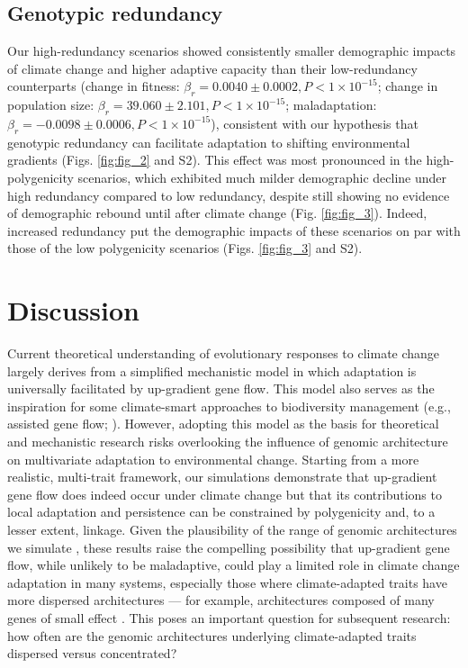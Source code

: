 \documentclass[9pt,twocolumn,twoside,lineno]{new_article}
\begin{document}
\subsection*{Genotypic redundancy}
Our high-redundancy scenarios showed
consistently smaller demographic impacts of climate change and higher adaptive capacity
than their low-redundancy counterparts 
(change in fitness: $\beta_{r} = 0.0040\pm0.0002, P<1\times10^{-15}$;
change in population size: $\beta_{r} = 39.060\pm2.101, P<1\times10^{-15}$;
maladaptation: $\beta_{r} = -0.0098\pm0.0006, P<1\times10^{-15}$), consistent with our hypothesis that
genotypic redundancy can facilitate adaptation to shifting environmental gradients (Figs. \ref{fig:fig_2} and S2).
This effect was most pronounced in the high-polygenicity scenarios,
which exhibited much milder demographic decline under high redundancy compared to low redundancy,
despite still showing no evidence of demographic rebound until after climate change (Fig. \ref{fig:fig_3}).
Indeed, increased redundancy put the demographic
impacts of these scenarios on par with those
of the low polygenicity scenarios (Figs. \ref{fig:fig_3} and S2).


\section*{Discussion}

Current theoretical understanding of evolutionary responses to climate change
largely derives from a simplified mechanistic model in which
adaptation is universally facilitated by up-gradient gene flow.
This model also serves as the inspiration for some climate-smart
approaches to biodiversity management
(e.g., assisted gene flow; \cite{aitken_whitlock}).
However, adopting this model as the basis
for theoretical and mechanistic research
risks overlooking the influence of
genomic architecture on multivariate adaptation to environmental change.
Starting from a more realistic, multi-trait framework,
our simulations demonstrate that up-gradient gene flow does indeed
occur under climate change
but that its contributions to local adaptation and persistence can be constrained
by polygenicity and, to a lesser extent, linkage.
Given the plausibility of the range of genomic architectures we simulate
\cite{barghi_polygenic,boyle,rockman,savolainen,sella,bomblies},
these results raise the compelling
possibility that up-gradient gene flow, while unlikely
to be maladaptive, could play a limited role in
climate change adaptation in many systems,
especially those where climate-adapted traits
have more dispersed architectures --- for example, architectures composed of many genes of small effect \cite{yeaman_review}.
This poses an important question for subsequent research:
how often are the genomic architectures underlying climate-adapted traits dispersed
versus concentrated?
\end{document}
